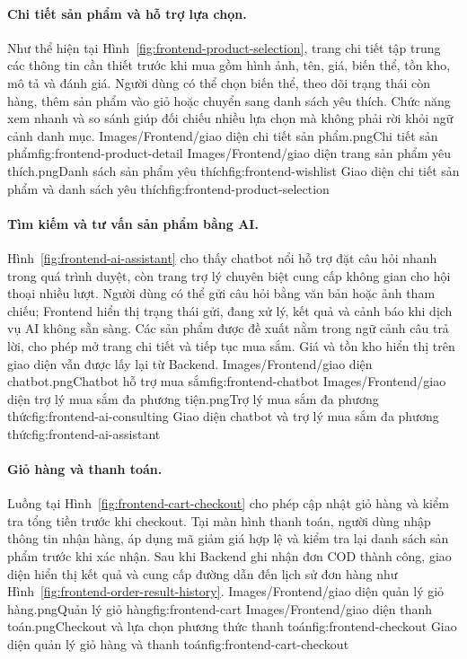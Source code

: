 \paragraph{Chi tiết sản phẩm và hỗ trợ lựa chọn.}

Như thể hiện tại Hình~\ref{fig:frontend-product-selection}, trang chi tiết tập trung các thông tin cần thiết trước khi mua gồm hình ảnh, tên, giá, biến thể,
tồn kho, mô tả và đánh giá. Người dùng có thể chọn biến thể, theo dõi trạng thái còn hàng, thêm sản
phẩm vào giỏ hoặc chuyển sang danh sách yêu thích. Chức năng xem nhanh và so sánh giúp đối chiếu
nhiều lựa chọn mà không phải rời khỏi ngữ cảnh danh mục.
\frontendpair
{Images/Frontend/giao diện chi tiết sản phẩm.png}{Chi tiết sản phẩm}{fig:frontend-product-detail}
{Images/Frontend/giao diện trang sản phẩm yêu thích.png}{Danh sách sản phẩm yêu thích}{fig:frontend-wishlist}
{Giao diện chi tiết sản phẩm và danh sách yêu thích}{fig:frontend-product-selection}

\paragraph{Tìm kiếm và tư vấn sản phẩm bằng AI.}

Hình~\ref{fig:frontend-ai-assistant} cho thấy chatbot nổi hỗ trợ đặt câu hỏi nhanh trong quá trình duyệt, còn trang trợ lý chuyên biệt cung cấp
không gian cho hội thoại nhiều lượt. Người dùng có thể gửi câu hỏi bằng văn bản hoặc ảnh tham chiếu;
Frontend hiển thị trạng thái gửi, đang xử lý, kết quả và cảnh báo khi dịch vụ AI không sẵn sàng.
Các sản phẩm được đề xuất nằm trong ngữ cảnh câu trả lời, cho phép mở trang chi tiết và tiếp tục
mua sắm. Giá và tồn kho hiển thị trên giao diện vẫn được lấy lại từ Backend.
\frontendpair
{Images/Frontend/giao diện chatbot.png}{Chatbot hỗ trợ mua sắm}{fig:frontend-chatbot}
{Images/Frontend/giao diện trợ lý mua sắm đa phương tiện.png}{Trợ lý mua sắm đa phương thức}{fig:frontend-ai-consulting}
{Giao diện chatbot và trợ lý mua sắm đa phương thức}{fig:frontend-ai-assistant}

\paragraph{Giỏ hàng và thanh toán.}

Luồng tại Hình~\ref{fig:frontend-cart-checkout} cho phép cập nhật giỏ hàng và kiểm tra tổng tiền trước khi checkout. Tại
màn hình thanh toán, người dùng nhập thông tin nhận hàng, áp dụng mã giảm giá hợp lệ và kiểm tra
lại danh sách sản phẩm trước khi xác nhận. Sau khi Backend ghi nhận đơn COD thành công, giao diện
hiển thị kết quả và cung cấp đường dẫn đến lịch sử đơn hàng như Hình~\ref{fig:frontend-order-result-history}.
\frontendpair
{Images/Frontend/giao diện quản lý giỏ hàng.png}{Quản lý giỏ hàng}{fig:frontend-cart}
{Images/Frontend/giao diện thanh toán.png}{Checkout và lựa chọn phương thức thanh toán}{fig:frontend-checkout}
{Giao diện quản lý giỏ hàng và thanh toán}{fig:frontend-cart-checkout}

